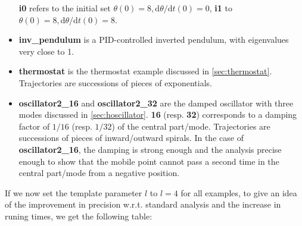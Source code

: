 \documentclass[a4paper,11pt]{article}
\begin{document}
\begin{itemize}
  \textbf{i0} refers to the initial set
  $\theta(0)=8, \mathrm{d}\theta/\mathrm{d}t(0)=0$, \textbf{i1}
  to $\theta(0)=8, \mathrm{d}\theta/\mathrm{d}t(0)=8$.
\item \textbf{inv\_pendulum} is a PID-controlled inverted
  pendulum, with eigenvalues very close to 1.
\item \textbf{thermostat} is the thermostat example discussed in
  \ref{sec:thermostat}. Trajectories are successions of pieces of
  exponentials.

\item \textbf{oscillator2\_16} and \textbf{oscillator2\_32} are the
  damped oscillator with three modes discussed in
  \ref{sec:hoscillator}. \textbf{16} (resp. \textbf{32})
  corresponds to a damping factor of $1/16$ (resp. $1/32$) of the
  central part/mode.  Trajectories are successions of pieces of
  inward/outward spirals.  In the case of \textbf{oscillator2\_16},
  the damping is strong enough and the analysis precise enough to
  show that the mobile point cannot pass a second time in the
  central part/mode from a negative position.
\end{itemize}

If we now set the template parameter $l$ to $l=4$ for all
examples, to give an idea of the improvement in precision
w.r.t. standard analysis and the increase in runing times, we get
the following table:
\end{document}
